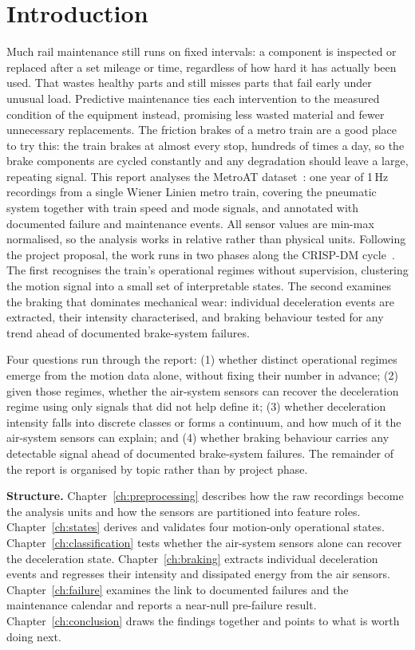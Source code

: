 \chapter{Introduction}
\label{ch:introduction}
Much rail maintenance still runs on fixed intervals: a component is inspected or replaced after
a set mileage or time, regardless of how hard it has actually been used. That wastes healthy
parts and still misses parts that fail early under unusual load. Predictive maintenance ties
each intervention to the measured condition of the equipment instead, promising less wasted
material and fewer unnecessary replacements. The friction brakes of a metro train are a good
place to try this: the train brakes at almost every stop, hundreds of times a day, so the brake
components are cycled constantly and any degradation should leave a large, repeating signal.
This report analyses the MetroAT dataset~\cite{MetroAT:2026}: one year of 1\,Hz recordings from a
single Wiener Linien metro train, covering the pneumatic system together with train speed and mode
signals, and annotated with documented failure and maintenance events. All sensor values are
min-max normalised, so the analysis works in relative rather than physical units. Following the
project proposal, the work runs in two phases along the CRISP-DM cycle~\cite{WirthHipp:00}. The first recognises the
train's operational regimes without supervision, clustering the motion signal into a small set of
interpretable states. The second examines the braking that dominates mechanical wear: individual
deceleration events are extracted, their intensity characterised, and braking behaviour tested for
any trend ahead of documented brake-system failures.

Four questions run through the report: (1) whether distinct operational regimes emerge from the
motion data alone, without fixing their number in advance; (2) given those regimes, whether the
air-system sensors can recover the deceleration regime using only signals that did not help define
it; (3) whether deceleration intensity falls into discrete classes or forms a continuum, and how
much of it the air-system sensors can explain; and (4) whether braking behaviour carries any
detectable signal ahead of documented brake-system failures. The remainder of the report is organised by topic rather than by project phase.

\textbf{Structure.} Chapter~\ref{ch:preprocessing} describes how the raw recordings become the
analysis units and how the sensors are partitioned into feature roles.
Chapter~\ref{ch:states} derives and validates four motion-only operational states.
Chapter~\ref{ch:classification} tests whether the air-system sensors alone can recover the
deceleration state. Chapter~\ref{ch:braking} extracts individual deceleration events and regresses
their intensity and dissipated energy from the air sensors. Chapter~\ref{ch:failure} examines the
link to documented failures and the maintenance calendar and reports a near-null pre-failure
result. Chapter~\ref{ch:conclusion} draws the findings together and points to what is worth doing
next.

